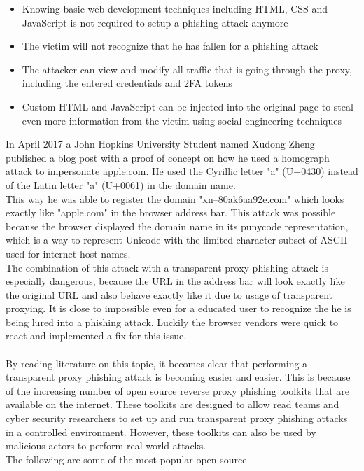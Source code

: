 \documentclass[12pt]{scrbook}
\begin{document}
\begin{itemize}
  \item Knowing basic web development techniques including HTML,
    CSS and JavaScript is not required to setup a phishing attack anymore
  \item The victim will not recognize that he has fallen for a phishing attack
  \item The attacker can view and modify all traffic that is going through the
    proxy, including the entered credentials and 2FA tokens
  \item Custom HTML and JavaScript can be injected into the original page to
    steal even more information from the victim using social engineering techniques
\end{itemize}

In April 2017 a John Hopkins University Student named Xudong Zheng published a
blog post with a proof of concept on how he used a homograph attack to
impersonate apple.com. He used the Cyrillic letter "a" (U+0430) instead of the
Latin letter "a" (U+0061) in the domain name.\\This way he was able to register
the domain "xn--80ak6aa92e.com" which looks exactly like "apple.com" in the
browser address bar. This attack was possible because the browser displayed the
domain name in its punycode representation, which is a way to represent Unicode
with the limited character subset of ASCII used for internet host names.\\ The
combination of this attack with a transparent proxy phishing attack is
especially dangerous, because the URL in the address bar will look exactly like
the original URL and also behave exactly like it due to usage of transparent
proxying. It is close to impossible even for a educated user to recognize the he
is being lured into a phishing attack. Luckily the browser vendors were quick to
react and implemented a fix for this issue.\\ \\ By reading literature on this
topic, it becomes clear that performing a transparent proxy phishing attack is
becoming easier and easier. This is because of the increasing number of open
source reverse proxy phishing toolkits that are available on the internet. These
toolkits are designed to allow read teams and cyber security researchers to set
up and run transparent proxy phishing attacks in a controlled environment.
However, these toolkits can also be used by malicious actors to perform
real-world attacks.\\The following are some of the most popular open source
\end{document}
